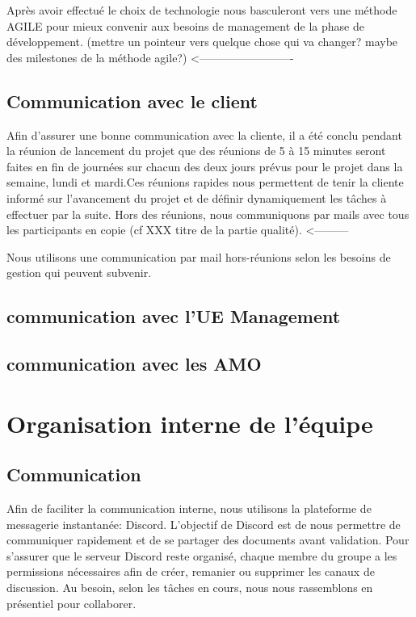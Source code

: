 \documentclass[11pt]{rapport_class}
\begin{document}
Après avoir effectué le choix de technologie nous basculeront vers une méthode AGILE pour mieux convenir aux besoins de management de la phase de développement. (mettre un pointeur vers quelque chose qui va changer? maybe des milestones de la méthode agile?) <-------------------------

\subsection{Communication avec le client}
\qquad Afin d'assurer une bonne communication avec la cliente, il a été conclu pendant la réunion de lancement du projet que des réunions de 5 à 15 minutes seront faites en fin de journées sur chacun des deux jours prévus pour le projet dans la semaine, lundi et mardi.Ces réunions rapides nous permettent de tenir la cliente informé 
sur l'avancement du projet et de définir dynamiquement les tâches à effectuer par la suite. Hors des réunions, nous communiquons par mails avec tous les participants en copie (cf XXX titre de la partie qualité). <---------

Nous utilisons une communication par mail hors-réunions selon les besoins de gestion qui peuvent subvenir.

\subsection{communication avec l'UE Management} 

\subsection{communication avec les AMO} 

\section{Organisation interne de l'équipe}
\subsection{Communication}
\qquad Afin de faciliter la communication interne, nous utilisons la plateforme de messagerie instantanée: Discord. L'objectif de Discord est de nous permettre de communiquer rapidement et de se partager des documents avant validation. Pour s'assurer que le serveur Discord reste organisé, chaque membre du groupe a les permissions nécessaires afin de créer, remanier ou supprimer les canaux de discussion.
Au besoin, selon les tâches en cours, nous nous rassemblons en présentiel pour collaborer.
\end{document}
